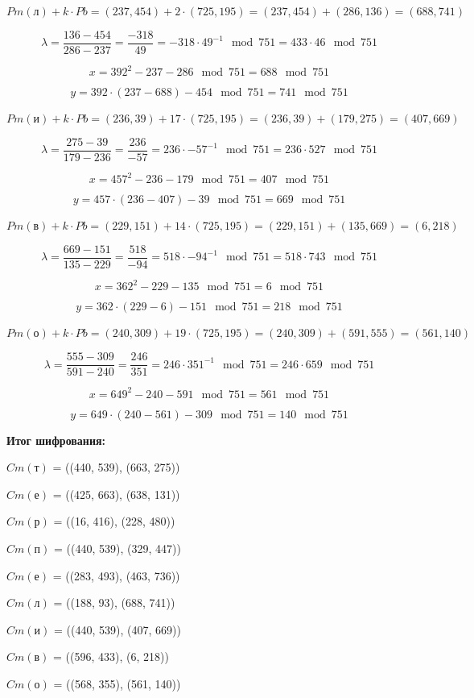 \textbf{$Pm(\text{л})+k \cdot Pb = (237, 454) + 2 \cdot (725, 195) = (237, 454) + (286, 136) = (688, 741)$}

\[
\lambda = \frac{136-454}{286-237} = \frac{-318}{49} = -318 \cdot 49^{-1}\mod{751} = 433 \cdot 46\mod{751}
\]


\[
x = 392^2 - 237 - 286 \mod{751} = 688\mod{751}
\]


\[
y = 392 \cdot (237 - 688) - 454\mod{751} = 741\mod{751}
\]

\textbf{$Pm(\text{и})+k \cdot Pb = (236, 39) + 17 \cdot (725, 195) = (236, 39) + (179, 275) = (407, 669)$}

\[
\lambda = \frac{275-39}{179-236} = \frac{236}{-57} = 236 \cdot -57^{-1}\mod{751} = 236 \cdot 527\mod{751}
\]


\[
x = 457^2 - 236 - 179 \mod{751} = 407\mod{751}
\]


\[
y = 457 \cdot (236 - 407) - 39\mod{751} = 669\mod{751}
\]

\textbf{$Pm(\text{в})+k \cdot Pb = (229, 151) + 14 \cdot (725, 195) = (229, 151) + (135, 669) = (6, 218)$}

\[
\lambda = \frac{669-151}{135-229} = \frac{518}{-94} = 518 \cdot -94^{-1}\mod{751} = 518 \cdot 743\mod{751}
\]


\[
x = 362^2 - 229 - 135 \mod{751} = 6\mod{751}
\]


\[
y = 362 \cdot (229 - 6) - 151\mod{751} = 218\mod{751}
\]

\textbf{$Pm(\text{о})+k \cdot Pb = (240, 309) + 19 \cdot (725, 195) = (240, 309) + (591, 555) = (561, 140)$}

\[
\lambda = \frac{555-309}{591-240} = \frac{246}{351} = 246 \cdot 351^{-1}\mod{751} = 246 \cdot 659\mod{751}
\]


\[
x = 649^2 - 240 - 591 \mod{751} = 561\mod{751}
\]


\[
y = 649 \cdot (240 - 561) - 309\mod{751} = 140\mod{751}
\]

\textbf{Итог шифрования:}

$Cm(\text{т})$ = ((440, 539), (663, 275))

$Cm(\text{е})$ = ((425, 663), (638, 131))

$Cm(\text{р})$ = ((16, 416), (228, 480))

$Cm(\text{п})$ = ((440, 539), (329, 447))

$Cm(\text{е})$ = ((283, 493), (463, 736))

$Cm(\text{л})$ = ((188, 93), (688, 741))

$Cm(\text{и})$ = ((440, 539), (407, 669))

$Cm(\text{в})$ = ((596, 433), (6, 218))

$Cm(\text{о})$ = ((568, 355), (561, 140))

